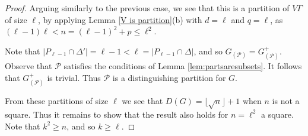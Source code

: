 \documentclass[10pt,a4paper]{amsart}
\begin{document}
\begin{proof}
Arguing similarly to the previous case, we see that this is a partition of  \(V\Gamma\) of size $\ell$,
by applying Lemma \ref{V is partition}(b) with $d = \ell$ and $q = \ell$, as $(\ell-1)\ell<n=(\ell-1)^{2}+p\leqslant \ell^2.$

Note that \(|P_{\ell - 1}\cap\Delta'|=\ell-1<\ell=|P_{\ell - 1}\cap\Delta|\),
and so $G_{(\mathcal{P})}=G^+_{(\mathcal{P})}$. 
Observe that \(\mathcal{P}\) satisfies the conditions of Lemma \ref{lem:partsaresubsets}. It follows that $G^+_{(\mathcal{P})}$ is trivial.
Thus $\mathcal{P}$ is a distinguishing partition for $G$.

%
%





From these partitions of size \(\ell\)  we see that \(D(G)=\lfloor \sqrt{n}\rfloor+1\) when \(n\) is not a square.
Thus it remains to show that the result also holds for \(n=\ell^{2}\) a square.
Note that \(k^{2}\geqslant n\), and so \(k\geqslant \ell\). 


\end{proof}
\end{document}
